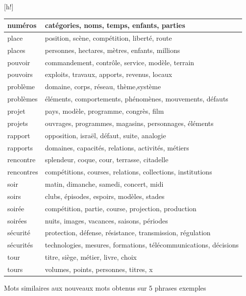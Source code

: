 \documentclass{style/these}
\makeatletter
\renewcommand\familydefault{ptm}
\newenvironment{aTable}%
  {%
   \renewcommand{\familydefault}{lmtt}\selectfont
  \@float{table}}
  {\end@float}
\makeatother
\begin{document}
\begin{part}
\begin{aTable}[h!]
\begin{tabular}{|l|l|}
numéros 	& catégories, noms, temps, enfants, parties 		\\ \hline
place 		& position, scène, compétition, liberté, route		\\ \hline
places  	& personnes, hectares, mètres, enfants, millions	\\ \hline
pouvoir  	& commandement, contrôle, service, modèle, terrain	\\ \hline
pouvoirs  	& exploits, travaux, apports, revenus,	locaux		\\ \hline
problème  	& domaine, corps, réseau, thème,système			\\ \hline
problèmes  	& éléments, comportements, phénomènes, mouvements, défauts 		\\ \hline
projet  	& pays, modèle, programme, congrès, film		 		\\ \hline
projets  	& ouvrages, programmes, magasins, personnages, 	éléments	 	\\ \hline
rapport  	& opposition, israël, défaut, suite, analogie				\\ \hline
rapports  	& domaines, capacités, relations, activités, métiers			\\ \hline
rencontre  	& splendeur, coque, cour, terrasse, citadelle				\\ \hline
rencontres  	& compétitions, courses, relations, collections, institutions		\\ \hline
soir 		& matin, dimanche, samedi, concert, midi				\\ \hline
soirs  		& clubs, épisodes, espoirs, modèles, stades				\\ \hline
soirée  	& compétition, partie, course, projection, production			\\ \hline
soirées  	& nuits, images, vacances, saisons, périodes				\\ \hline
sécurité  	& protection, défense, résistance, transmission, régulation		\\ \hline
sécurités  	& technologies, mesures, formations, télécommunications, décisions	\\ \hline
tour 	 	& titre, siège, métier, livre, choix					\\ \hline
tours  		& volumes, points, personnes, titres, x 				\\ \hline
\end{tabular}
\caption{Mots similaires aux nouveaux mots obtenus sur 5 phrases exemples}
\label{Tab:SWords-5}
\end{aTable}


\end{part}
\end{document}
